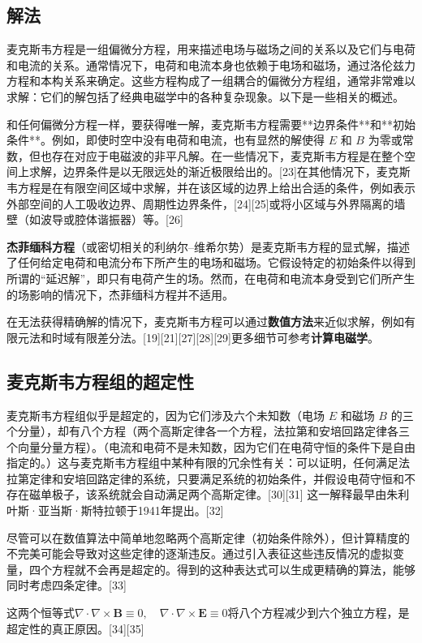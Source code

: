 \subsection{解法}
麦克斯韦方程是一组偏微分方程，用来描述电场与磁场之间的关系以及它们与电荷和电流的关系。通常情况下，电荷和电流本身也依赖于电场和磁场，通过洛伦兹力方程和本构关系来确定。这些方程构成了一组耦合的偏微分方程组，通常非常难以求解：它们的解包括了经典电磁学中的各种复杂现象。以下是一些相关的概述。

和任何偏微分方程一样，要获得唯一解，麦克斯韦方程需要**边界条件**和**初始条件**。例如，即使时空中没有电荷和电流，也有显然的解使得 \( E \) 和 \( B \) 为零或常数，但也存在对应于电磁波的非平凡解。在一些情况下，麦克斯韦方程是在整个空间上求解，边界条件是以无限远处的渐近极限给出的。[23]在其他情况下，麦克斯韦方程是在有限空间区域中求解，并在该区域的边界上给出合适的条件，例如表示外部空间的人工吸收边界、周期性边界条件，[24][25]或将小区域与外界隔离的墙壁（如波导或腔体谐振器）等。[26]

\textbf{杰菲缅科方程}（或密切相关的利纳尔–维希尔势）是麦克斯韦方程的显式解，描述了任何给定电荷和电流分布下所产生的电场和磁场。它假设特定的初始条件以得到所谓的“延迟解”，即只有电荷产生的场。然而，在电荷和电流本身受到它们所产生的场影响的情况下，杰菲缅科方程并不适用。

在无法获得精确解的情况下，麦克斯韦方程可以通过\textbf{数值方法}来近似求解，例如有限元法和时域有限差分法。[19][21][27][28][29]更多细节可参考\textbf{计算电磁学}。

\subsection{麦克斯韦方程组的超定性}
麦克斯韦方程组似乎是超定的，因为它们涉及六个未知数（电场 \(E\) 和磁场 \(B\) 的三个分量），却有八个方程（两个高斯定律各一个方程，法拉第和安培回路定律各三个向量分量方程）。（电流和电荷不是未知数，因为它们在电荷守恒的条件下是自由指定的。）这与麦克斯韦方程组中某种有限的冗余性有关：可以证明，任何满足法拉第定律和安培回路定律的系统，只要满足系统的初始条件，并假设电荷守恒和不存在磁单极子，该系统就会自动满足两个高斯定律。[30][31] 这一解释最早由朱利叶斯·亚当斯·斯特拉顿于1941年提出。[32]

尽管可以在数值算法中简单地忽略两个高斯定律（初始条件除外），但计算精度的不完美可能会导致对这些定律的逐渐违反。通过引入表征这些违反情况的虚拟变量，四个方程就不会再是超定的。得到的这种表达式可以生成更精确的算法，能够同时考虑四条定律。[33]

这两个恒等式\(\nabla \cdot \nabla \times \mathbf{B} \equiv 0, \quad \nabla \cdot \nabla \times \mathbf{E} \equiv 0\)将八个方程减少到六个独立方程，是超定性的真正原因。[34][35]

